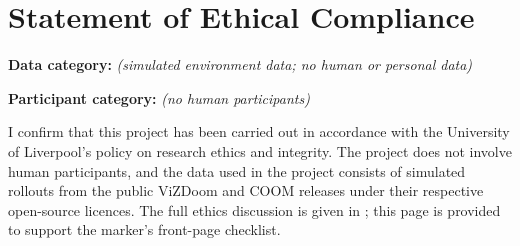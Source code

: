 \cleardoublepage
\chapter*{Statement of Ethical Compliance}
\thispagestyle{anonymous}


\noindent\textbf{Data category:}\quad
{}\quad
\textit{(simulated environment data; no human or personal data)}

\medskip
\noindent\textbf{Participant category:}\quad
{}\quad
\textit{(no human participants)}

\medskip
\noindent
I confirm that this project has been carried out in accordance with
the University of Liverpool's policy on research ethics and
integrity. The project does not involve human participants, and the
data used in the project consists of simulated rollouts from the
public ViZDoom and COOM releases under their respective open-source
licences. The full ethics discussion is given in
; this page is provided to support the marker's
front-page checklist.
